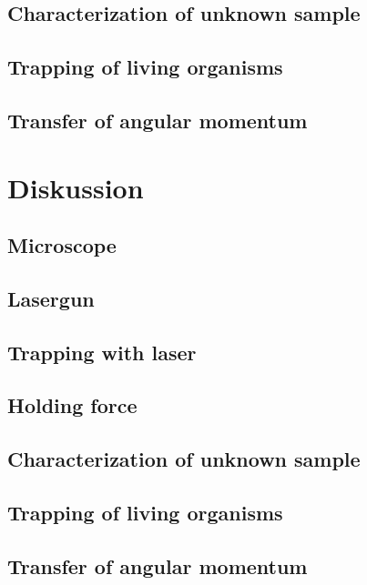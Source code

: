 \documentclass[12pt,english,ngerman]{scrartcl}
\begin{document}
\subsection{Characterization of unknown sample}

\subsection{Trapping of living organisms}

\subsection{Transfer of angular momentum}

\section{Diskussion}\label{sec:diskussion}

\subsection{Microscope}

\subsection{Lasergun}

\subsection{Trapping with laser}

\subsection{Holding force}

\subsection{Characterization of unknown sample}

\subsection{Trapping of living organisms}

\subsection{Transfer of angular momentum}
\end{document}
